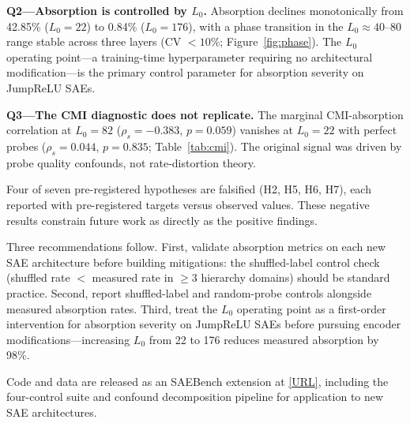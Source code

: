 \documentclass{article}
\begin{document}
\textbf{Q2---Absorption is controlled by $L_0$.} Absorption declines monotonically from 42.85\% ($L_0 = 22$) to 0.84\% ($L_0 = 176$), with a phase transition in the $L_0 \approx 40$--$80$ range stable across three layers (CV $< 10\%$; Figure~\ref{fig:phase}). The $L_0$ operating point---a training-time hyperparameter requiring no architectural modification---is the primary control parameter for absorption severity on JumpReLU SAEs.

\textbf{Q3---The CMI diagnostic does not replicate.} The marginal CMI-absorption correlation at $L_0 = 82$ ($\rho_s = -0.383$, $p = 0.059$) vanishes at $L_0 = 22$ with perfect probes ($\rho_s = 0.044$, $p = 0.835$; Table~\ref{tab:cmi}). The original signal was driven by probe quality confounds, not rate-distortion theory.

Four of seven pre-registered hypotheses are falsified (H2, H5, H6, H7), each reported with pre-registered targets versus observed values. These negative results constrain future work as directly as the positive findings.

Three recommendations follow. First, validate absorption metrics on each new SAE architecture before building mitigations: the shuffled-label control check (shuffled rate $<$ measured rate in $\geq 3$ hierarchy domains) should be standard practice. Second, report shuffled-label and random-probe controls alongside measured absorption rates. Third, treat the $L_0$ operating point as a first-order intervention for absorption severity on JumpReLU SAEs before pursuing encoder modifications---increasing $L_0$ from 22 to 176 reduces measured absorption by 98\%.

Code and data are released as an SAEBench extension at \url{[URL]}, including the four-control suite and confound decomposition pipeline for application to new SAE architectures.




\end{document}
